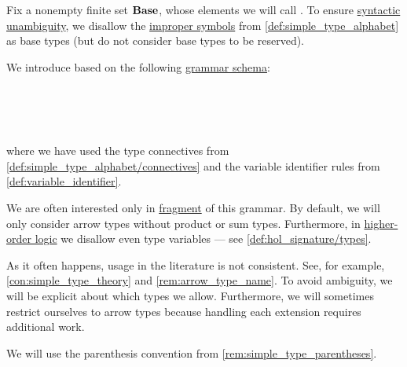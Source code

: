 \begin{definition}\label{def:simple_type}\mimprovised
  Fix a nonempty finite set \( \op*{Base} \), whose elements we will call . To ensure \hyperref[def:grammar_ambiguity]{syntactic unambiguity}, we disallow the \hyperref[con:improper_symbol]{improper symbols} from \cref{def:simple_type_alphabet} as base types (but do not consider base types to be reserved).

  We introduce  based on the following \hyperref[def:formal_grammar/schema]{grammar schema}:
  \begin{bnf*}
       {} \\
         { \bnfor {}} \\
          {\bnftsq{(} \bnfsp {} \bnfsp {} \bnfsp {} \bnfsp \bnftsq{)}} \\
                { \bnfor {}}
  \end{bnf*}
  where we have used the type connectives from \cref{def:simple_type_alphabet/connectives} and the variable identifier rules from \cref{def:variable_identifier}.

  We are often interested only in \hyperref[con:syntax_fragment]{fragment} of this grammar. By default, we will only consider arrow types without product or sum types. Furthermore, in \hyperref[def:simply_typed_hol]{higher-order logic} we disallow even type variables --- see \cref{def:hol_signature/types}.
\end{definition}
\begin{comments}
  \item As it often happens, usage in the literature is not consistent. See, for example, \cref{con:simple_type_theory} and \cref{rem:arrow_type_name}. To avoid ambiguity, we will be explicit about which types we allow. Furthermore, we will sometimes restrict ourselves to arrow types because handling each extension requires additional work.

  \item We will use the parenthesis convention from \cref{rem:simple_type_parentheses}.
\end{comments}

